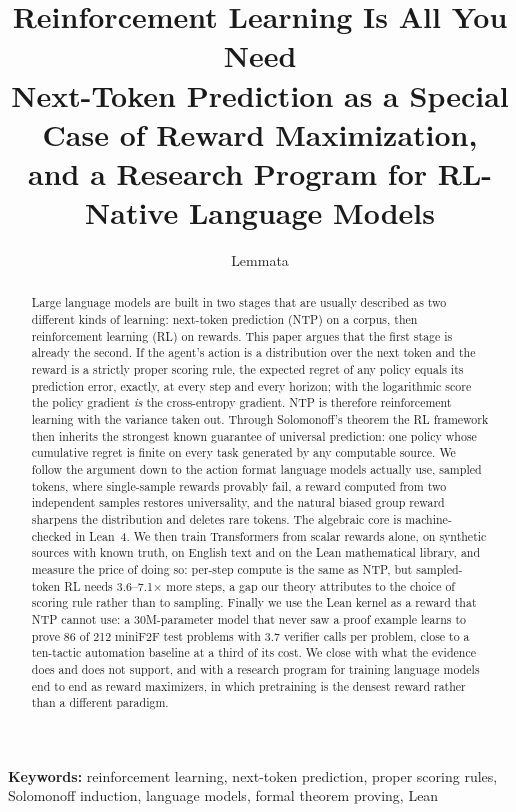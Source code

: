 \documentclass[11pt]{article}
\title{Reinforcement Learning Is All You Need\\[4pt]
\large Next-Token Prediction as a Special Case of Reward Maximization,\\ and a Research Program for RL-Native Language Models}
\author{Lemmata}
\date{}
\theoremstyle{definition}
\begin{document}
\maketitle

\begin{abstract}
Large language models are built in two stages that are usually described as two different kinds of learning: next-token prediction (NTP) on a corpus, then reinforcement learning (RL) on rewards. This paper argues that the first stage is already the second. If the agent's action is a distribution over the next token and the reward is a strictly proper scoring rule, the expected regret of any policy equals its prediction error, exactly, at every step and every horizon; with the logarithmic score the policy gradient \emph{is} the cross-entropy gradient. NTP is therefore reinforcement learning with the variance taken out. Through Solomonoff's theorem the RL framework then inherits the strongest known guarantee of universal prediction: one policy whose cumulative regret is finite on every task generated by any computable source. We follow the argument down to the action format language models actually use, sampled tokens, where single-sample rewards provably fail, a reward computed from two independent samples restores universality, and the natural biased group reward sharpens the distribution and deletes rare tokens. The algebraic core is machine-checked in Lean~4. We then train Transformers from scalar rewards alone, on synthetic sources with known truth, on English text and on the Lean mathematical library, and measure the price of doing so: per-step compute is the same as NTP, but sampled-token RL needs 3.6--7.1$\times$ more steps, a gap our theory attributes to the choice of scoring rule rather than to sampling. Finally we use the Lean kernel as a reward that NTP cannot use: a 30M-parameter model that never saw a proof example learns to prove 86 of 212 miniF2F test problems with 3.7 verifier calls per problem, close to a ten-tactic automation baseline at a third of its cost. We close with what the evidence does and does not support, and with a research program for training language models end to end as reward maximizers, in which pretraining is the densest reward rather than a different paradigm.
\end{abstract}

\noindent\textbf{Keywords:} reinforcement learning, next-token prediction, proper scoring rules, Solomonoff induction, language models, formal theorem proving, Lean
\end{document}
